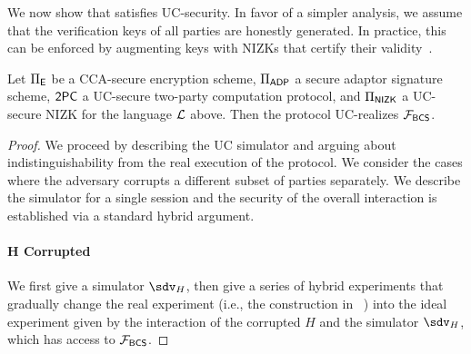 We now show that \aaluc satisfies UC-security. 
In favor of a simpler analysis, we assume that the verification keys of all parties are honestly generated. In practice, this can be enforced by augmenting keys with NIZKs that certify their validity~\cite{PKC:Boldyreva03,EC:LOSSW06}.

\begin{theorem}\label{thm:a2luc}
Let $\Pi_{\mathsf{E}}$ be a CCA-secure encryption scheme, $\Pi_{\mathsf{ADP}}$ a secure adaptor signature scheme, $\mathsf{2PC}$ a UC-secure two-party computation protocol, and $\Pi_{\mathsf{NIZK}}$ a UC-secure NIZK for the language $\mathcal{L}$ above. Then the \aaluc protocol UC-realizes $\mathcal{F}_{\mathsf{BCS}}$.
\end{theorem}
\begin{proof}
We proceed by describing the UC simulator and arguing about indistinguishability from the real execution of the protocol. We consider the cases where the adversary corrupts a different subset of parties separately. We describe the simulator for a single session and the security of the overall interaction is established via a standard hybrid argument.

\paragraph{H Corrupted}
We first give a simulator $\Sim_H$, then give a series of hybrid experiments that gradually change the real experiment (i.e., the construction in ~) into the ideal experiment given by the interaction of the corrupted $H$ and the simulator $\Sim_H$, which has access to $\mathcal{F}_{\mathsf{BCS}}$.


\end{proof}
